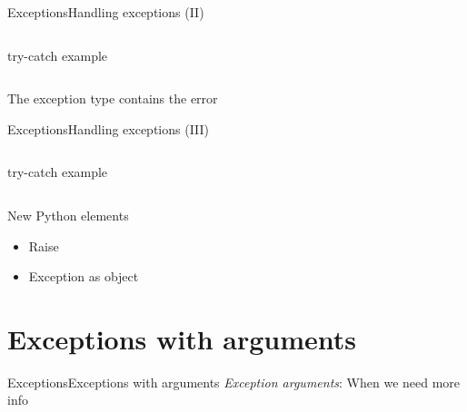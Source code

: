 \documentclass[10pt,compress]{beamer} %
\begin{document}
\begin{frame}{Exceptions}{Handling exceptions (II)}
    \begin{columns}
	\begin{exampleblock}{try-catch example}
	\vspace{-0.2cm}
		
	\vspace{-0.2cm}
	\end{exampleblock}
	\end{columns}
	\bigskip
	The exception type contains the error
\end{frame}

\begin{frame}{Exceptions}{Handling exceptions (III)}
	\vspace{-0.2cm}
    \begin{columns}
	\begin{exampleblock}{try-catch example}
	\vspace{-0.2cm}
		
	\vspace{-0.2cm}
	\end{exampleblock}
	\end{columns}
	\bigskip
	New Python elements
		\begin{itemize}
		\item Raise
        \item Exception as object
		\end{itemize}
\end{frame}

\section{Exceptions with arguments}
\begin{frame}{Exceptions}{Exceptions with arguments}
	\vspace{-0.2cm}
	\textit{Exception arguments}: When we need more info

	\vspace{-0.2cm}
    \begin{columns}
	\begin{exampleblock}{}
	\vspace{-0.2cm}
		
	\vspace{-0.2cm}
	\end{exampleblock}

	\vspace{-0.3cm}

	\begin{exampleblock}{}
	\vspace{-0.2cm}
		
	\vspace{-0.2cm}
	\end{exampleblock}

	\end{columns}
\end{frame}
\end{document}
